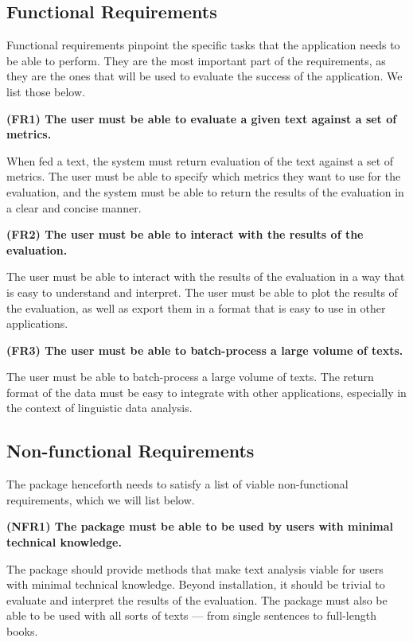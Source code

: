 \subsection{Functional Requirements}\label{sec:func_requirements}
Functional requirements pinpoint the specific tasks that the application needs to be able to perform. They are the most important part of the requirements, as they are the ones that will be used to evaluate the success of the application. We list those below.

\textbf{(FR1) The user must be able to evaluate a given text against a set of metrics.}

When fed a text, the system must return evaluation of the text against a set of metrics. The user must be able to specify which metrics they want to use for the evaluation, and the system must be able to return the results of the evaluation in a clear and concise manner.

\textbf{(FR2) The user must be able to interact with the results of the evaluation.}

The user must be able to interact with the results of the evaluation in a way that is easy to understand and interpret. The user must be able to plot the results of the evaluation, as well as export them in a format that is easy to use in other applications.

\textbf{(FR3) The user must be able to batch-process a large volume of texts.}

The user must be able to batch-process a large volume of texts. The return format of the data must be easy to integrate with other applications, especially in the context of linguistic data analysis.


\subsection{Non-functional Requirements}\label{sec:nfunc_requirements}
The package henceforth needs to satisfy a list of viable non-functional requirements, which we will list below.

\textbf{(NFR1) The package must be able to be used by users with minimal technical knowledge.}

The package should provide methods that make text analysis viable for users with minimal technical knowledge. Beyond installation, it should be trivial to evaluate and interpret the results of the evaluation.  The package must also be able to be used with all sorts of texts --- from single sentences to full-length books.


